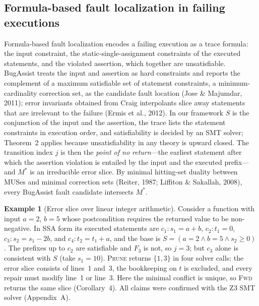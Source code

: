 \documentclass[11pt,reqno]{amsart}
\theoremstyle{plain}
\theoremstyle{definition}
\newtheorem{example}{Example}
\newcommand{\Mstar}{M^{*}}
\newcommand{\PRUNE}{\textsc{Prune}}
\newcommand{\FWD}{\textsc{Fwd}}
\begin{document}
\subsection{Formula-based fault localization in failing executions}
Formula-based fault localization encodes a failing execution as a trace formula:
the input constraint, the static-single-assignment constraints of the executed
statements, and the violated assertion, which together are unsatisfiable. BugAssist
treats the input and assertion as hard constraints and reports the complement of a
maximum satisfiable set of statement constraints, a minimum-cardinality correction
set, as the candidate fault location (Jose \& Majumdar, 2011); error invariants
obtained from Craig interpolants slice away statements that are irrelevant to the
failure (Ermis et al., 2012). In our framework $S$ is the conjunction of the input
and the assertion, the trace lists the statement constraints in execution order,
and satisfiability is decided by an SMT solver; Theorem~2 applies because
unsatisfiability in any theory is upward closed. The transition index $j$ is then
the \emph{point of no return}---the earliest statement after which the assertion
violation is entailed by the input and the executed prefix---and $\Mstar$ is an
irreducible error slice. By minimal hitting-set duality between MUSes and minimal
correction sets (Reiter, 1987; Liffiton \& Sakallah, 2008), every BugAssist fault
candidate intersects $\Mstar$.

\begin{example}[Error slice over linear integer arithmetic]
Consider a function with input $a=2$, $b=5$ whose postcondition requires the
returned value to be non-negative. In SSA form its executed statements are
$c_1\colon s_1=a+b$, $c_2\colon t_1=0$, $c_3\colon s_2=s_1-2b$, and
$c_4\colon t_2=t_1+a$, and the base is $S=(a=2\wedge b=5\wedge s_2\ge0)$. The
prefixes up to $c_2$ are satisfiable and $F_3$ is not, so $j=3$; but $c_3$ alone is
consistent with $S$ (take $s_1=10$). \PRUNE{} returns $\{1,3\}$ in four solver
calls: the error slice consists of lines~1 and~3, the bookkeeping on $t$ is
excluded, and every repair must modify line~1 or line~3. Here the minimal conflict
is unique, so \FWD{} returns the same slice (Corollary~4). All claims were confirmed
with the Z3 SMT solver (Appendix~A).
\end{example}
\end{document}
